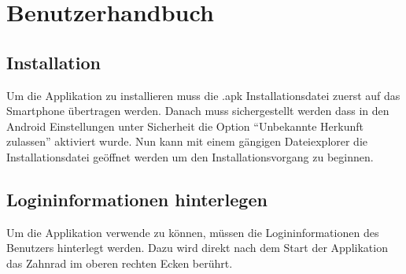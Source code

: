 \pagebreak
\section{Benutzerhandbuch}

\subsection{Installation}
Um die Applikation zu installieren muss die .apk Installationsdatei zuerst auf das Smartphone übertragen werden. Danach muss sichergestellt werden dass in den Android Einstellungen unter Sicherheit die Option \enquote{Unbekannte Herkunft zulassen} aktiviert wurde. Nun kann mit einem gängigen Dateiexplorer die Installationsdatei geöffnet werden um den Installationsvorgang zu beginnen.

\subsection{Logininformationen hinterlegen}

Um die Applikation verwende zu können, müssen die Logininformationen des Benutzers hinterlegt werden. Dazu wird direkt nach dem Start der Applikation das Zahnrad im oberen rechten Ecken berührt.

